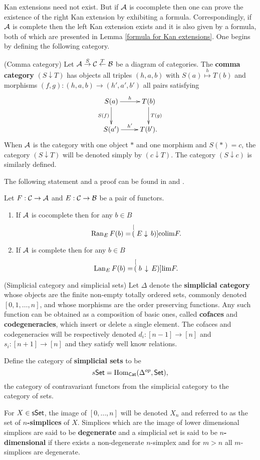 \documentclass[thesis.tex]{subfiles}
\begin{document}
Kan extensions need not exist. But if $\operatorname{\mathcal{A}}$ is cocomplete then one can prove the existence of the right Kan extension by exhibiting a formula. Correspondingly, if $\operatorname{\mathcal{A}}$ is complete then the left Kan extension exists and it is also given by a formula, both of which are presented in Lemma \ref{formula for Kan extensions}. One begins by defining the following category.

\begin{definition}(Comma category) \label{comma category}
Let $\operatorname{\mathcal{A}}\stackrel{S}{\to}\operatorname{\mathcal{C}}\stackrel{T}{\leftarrow}\operatorname{\mathcal{B}}$ be a diagram of categories. The \textbf{comma category} $(S\downarrow T)$ has objects all triples $(h,a,b)$ with $S(a)\stackrel{h}{\mapsto}T(b)$ and morphisms $(f,g):(h,a,b)\to(h',a',b')$ all pairs satisfying $$\xymatrix{S(a)\ar^h[r]\ar_{S(f)}[d] & T(b)\ar^{T(g)}[d]\\ S(a')\ar^{h'}[r] & T(b').}$$
When $\operatorname{\mathcal{A}}$ is the category with one object $\ast$ and one morphism and $S(\ast)=c$, the category $(S\downarrow T)$ will be denoted simply by $(c\downarrow T)$. The category $(S\downarrow c)$ is similarly defined.
\end{definition}

The following statement and a proof can be found in \cite[p.237]{MaL98} and \cite[p.244]{MaL98}.

\begin{lemma}\label{formula for Kan extensions}
Let $F:\operatorname{\mathcal{C}}\to\operatorname{\mathcal{A}}$ and $E:\operatorname{\mathcal{C}}\to\operatorname{\mathcal{B}}$ be a pair of functors.
\begin{enumerate}[1.]
\item If $\operatorname{\mathcal{A}}$ is cocomplete then for any $b\in B$
$$\operatorname{Ran}_E F(b)=\,\stackrel[(E\downarrow\, b)]{}{\operatorname*{colim}}F.$$
\item If $\operatorname{\mathcal{A}}$ is complete then for any $b\in B$
$$\operatorname{Lan}_E F(b)=\,\stackrel[(b\,\downarrow\, E)]{}{\mathrm{lim}}F.$$
\end{enumerate}
\end{lemma}

\begin{definition}(Simplicial category and simplicial sets) \label{Simplicial category and simplicial sets}
Let $\Delta$ denote the \textbf{simplicial category} whose objects are the finite non-empty totally ordered sets, commonly denoted $[0, 1, \dotsc, n]$, and whose morphisms are the order preserving functions. Any such function can be obtained as a composition of basic ones, called \textbf{cofaces} and \textbf{codegeneracies}, which insert or delete a single element. The cofaces and codegeneracies will be respectively denoted $d_i:[n-1]\to[n]$ and $s_i:[n+1]\to[n]$ and they satisfy well know relations.

Define the category of \textbf{simplicial sets} to be
$$s\mathsf{Set}=\mathrm{Hom}_{\mathsf{Cat}}(\Delta^{op},\mathsf{Set}),$$
the category of contravariant functors from the simplicial category to the category of sets.

For $X\in\mathsf{sSet}$, the image of $[0,\dotsc,n]$ will be denoted $X_n$ and referred to as the set of \textbf{$n$-simplices} of $X$. Simplices which are the image of lower dimensional simplices are said to be \textbf{degenerate} and a simplicial set is said to be \textbf{$n$-dimensional} if there exists a non-degenerate $n$-simplex and for $m>n$ all $m$-simplices are degenerate.
\end{definition}
\end{document}
